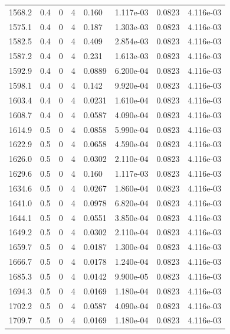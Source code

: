 \documentclass[preview]{standalone}
\begin{document}
{{{{{{{{\begin{tabular}{L{1.2cm}C{1.2cm} C{0.3cm}C{0.5cm} C{1.4cm}C{1.4cm} C{1.4cm}C{1.4cm}}
  1568.2  &   0.4  & 0     &  4 &  0.160  & 1.117e-03  & 0.0823 &  4.116e-03   \\ 
  1575.1  &   0.4  & 0     &  4 &  0.187  & 1.303e-03  & 0.0823 &  4.116e-03   \\ 
  1582.5  &   0.4  & 0     &  4 &  0.409  & 2.854e-03  & 0.0823 &  4.116e-03   \\ 
  1587.2  &   0.4  & 0     &  4 &  0.231  & 1.613e-03  & 0.0823 &  4.116e-03   \\ 
  1592.9  &   0.4  & 0     &  4 &  0.0889  & 6.200e-04  & 0.0823 &  4.116e-03   \\ 
  1598.1  &   0.4  & 0     &  4 &  0.142  & 9.920e-04  & 0.0823 &  4.116e-03   \\ 
  1603.4  &   0.4  & 0     &  4 &  0.0231  & 1.610e-04  & 0.0823 &  4.116e-03   \\ 
  1608.7  &   0.4  & 0     &  4 &  0.0587  & 4.090e-04  & 0.0823 &  4.116e-03   \\ 
  1614.9  &   0.5  & 0     &  4 &  0.0858  & 5.990e-04  & 0.0823 &  4.116e-03   \\ 
  1622.9  &   0.5  & 0     &  4 &  0.0658  & 4.590e-04  & 0.0823 &  4.116e-03   \\ 
  1626.0  &   0.5  & 0     &  4 &  0.0302  & 2.110e-04  & 0.0823 &  4.116e-03   \\ 
  1629.6  &   0.5  & 0     &  4 &  0.160  & 1.117e-03  & 0.0823 &  4.116e-03   \\ 
  1634.6  &   0.5  & 0     &  4 &  0.0267  & 1.860e-04  & 0.0823 &  4.116e-03   \\ 
  1641.0  &   0.5  & 0     &  4 &  0.0978  & 6.820e-04  & 0.0823 &  4.116e-03   \\ 
  1644.1  &   0.5  & 0     &  4 &  0.0551  & 3.850e-04  & 0.0823 &  4.116e-03   \\ 
  1649.2  &   0.5  & 0     &  4 &  0.0302  & 2.110e-04  & 0.0823 &  4.116e-03   \\ 
  1659.7  &   0.5  & 0     &  4 &  0.0187  & 1.300e-04  & 0.0823 &  4.116e-03   \\ 
  1666.7  &   0.5  & 0     &  4 &  0.0178  & 1.240e-04  & 0.0823 &  4.116e-03   \\ 
  1685.3  &   0.5  & 0     &  4 &  0.0142  & 9.900e-05  & 0.0823 &  4.116e-03   \\ 
  1694.3  &   0.5  & 0     &  4 &  0.0169  & 1.180e-04  & 0.0823 &  4.116e-03   \\ 
  1702.2  &   0.5  & 0     &  4 &  0.0587  & 4.090e-04  & 0.0823 &  4.116e-03   \\ 
  1709.7  &   0.5  & 0     &  4 &  0.0169  & 1.180e-04  & 0.0823 &  4.116e-03   \\ 

\end{tabular}}}}}}}}}
\end{document}
